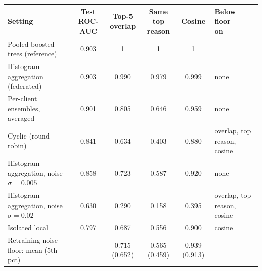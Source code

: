 \begin{tabular}{lccccl}
\toprule
Setting & \makecell{Test\\ROC-AUC} & \makecell{Top-5\\overlap} & \makecell{Same top\\reason} & Cosine & \makecell{Below floor\\on} \\
\midrule
Pooled boosted trees (reference) & 0.903 & 1 & 1 & 1 & \\
Histogram aggregation (federated) & 0.903 & 0.990 & 0.979 & 0.999 & none \\
Per-client ensembles, averaged & 0.901 & 0.805 & 0.646 & 0.959 & none \\
Cyclic (round robin) & 0.841 & 0.634 & 0.403 & 0.880 & overlap, top reason, cosine \\
Histogram aggregation, noise $\sigma=0.005$ & 0.858 & 0.723 & 0.587 & 0.920 & none \\
Histogram aggregation, noise $\sigma=0.02$ & 0.630 & 0.290 & 0.158 & 0.395 & overlap, top reason, cosine \\
Isolated local & 0.797 & 0.687 & 0.556 & 0.900 & cosine \\
Retraining noise floor: mean (5th pct) & & 0.715 (0.652) & 0.565 (0.459) & 0.939 (0.913) & \\
\bottomrule
\end{tabular}
